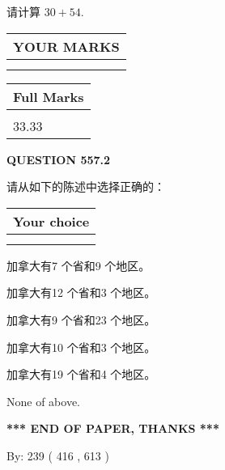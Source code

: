 \documentclass{ctexart}
\begin{document}
  
 
请计算 $ %
30 +  %
54 $.
 

 

 
  
\vspace{0.2in}
  
\noindent\begin{tabular}{|l|}
\hline
 YOUR MARKS  \\
\hline
 \\ 
 \\ 
\hline
\end{tabular}
\hspace{0.05in} \begin{tabular}{|l|}
\hline
 Full Marks  \\
\hline
 \\ 
33.33 \\
\hline
\end{tabular}
{\textbf{\Large{QUESTION
557.2 
}}}
  
  
请从如下的陈述中选择正确的：
  
  
\noindent\hspace{3.0in} \begin{tabular}{|l|}
\hline
Your choice \\
\hline
 \\ 
 \\ 
\hline
\end{tabular}
  
  
 
 
加拿大有7 个省和9 个地区。
 
 
加拿大有12 个省和3 个地区。
 
 
加拿大有9 个省和23 个地区。
 
 
加拿大有10 个省和3 个地区。
 
 
加拿大有19 个省和4 个地区。
 
 
 None of above.
 
 
   
   
 \vspace{0.2in}
 
   
   
   
   
\vspace{1.0in} 
{\textbf{\large{ *** END OF PAPER, THANKS *** }}} 
   
   
\hspace{1.0in} By: 
 239 ( 416 ,  613 )
   
\end{document}
